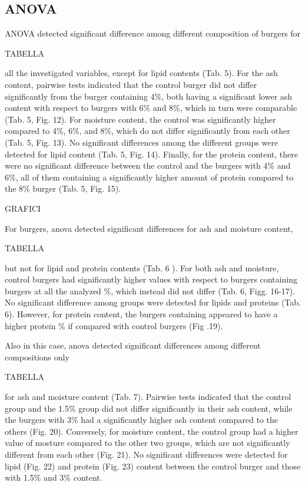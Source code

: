 \subsection{ANOVA}
ANOVA detected significant difference among different composition of  burgers for 

TABELLA

all the investigated variables, except for lipid contents (Tab. 5). For the ash content, pairwise tests indicated that the control burger did not differ significantly from the burger containing 4\%, both having a significant lower ash content with respect to burgers with 6\% and 8\%, which in turn were comparable (Tab. 5, Fig. 12).
For moisture content, the control was significantly higher compared to 4\%, 6\%, and 8\%, which do not differ significantly from each other (Tab. 5, Fig. 13). No significant differences among the different groups were detected for lipid content (Tab. 5, Fig. 14). Finally, for the protein content, there were no significant difference between the control and the burgers with 4\% and 6\%, all of them containing a significantly higher amount of protein compared to the 8\% burger (Tab. 5, Fig. 15).

GRAFICI

For  burgers, \gls{anova} detected significant differences for ash and moisture content, 

TABELLA

but not for lipid and protein contents (Tab. 6 ). For both ash and moisture, control burgers had significantly higher values with respect to burgers containing  burgers at all the analyzed \%, which instead did not differ (Tab. 6, Figg. 16-17). No significant difference among groups were detected for lipids and proteins (Tab. 6). However, for protein content, the burgers containing  appeared to have a higher protein \% if compared with control burgers (Fig .19).

Also in this case, \gls{anova} detected significant differences among different compositions only

TABELLA

for ash and moisture content (Tab. 7). Pairwise tests indicated that the control group and the 1.5\% group did not differ significantly in their ash content, while the burgers with 3\%  had a significantly higher ash content compared to the others (Fig. 20). Conversely, for moisture content, the control group had a higher value of mosture compared to the other two groups, which are not significantly different from each other (Fig. 21). No significant differences were detected for lipid (Fig. 22) and protein (Fig. 23) content between the control burger and those with 1.5\% and 3\% content.

